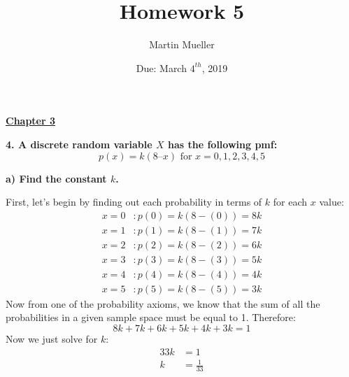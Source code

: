 \documentclass[12pt, letter]{article}
\title{Homework 5}
\author{Martin Mueller}
\date{Due: March $4^{th}$, 2019}
\begin{document}
\maketitle

\begin{center}
	\underline{\textbf{Chapter 3}}
\end{center}

\textbf{4. A discrete random variable $X$ has the following pmf:}
$$p(x) = k(8 – x)\text{ for }x = 0,1,2,3,4,5$$

\qquad \textbf{a) Find the constant $k$.}
\begin{center}
	First, let's begin by finding out each probability in terms of $k$ for each $x$ value:
	\begin{align*}
		x = 0&: p(0) = k(8 - (0)) = 8k \\
		x = 1&: p(1) = k(8 - (1)) = 7k \\
		x = 2&: p(2) = k(8 - (2)) = 6k \\
		x = 3&: p(3) = k(8 - (3)) = 5k \\
		x = 4&: p(4) = k(8 - (4)) = 4k \\
		x = 5&: p(5) = k(8 - (5)) = 3k
	\end{align*}
	Now from one of the probability axioms, we know that the sum of all the probabilities in a given sample space must be equal to 1. Therefore:
	$$8k + 7k + 6k + 5k + 4k + 3k = 1$$
	Now we just solve for $k$:
	\begin{align*}
		33k &= 1 \\
		k &= \boxed{\frac{1}{33}}
	\end{align*}
\end{center}

\pagebreak
\end{document}
